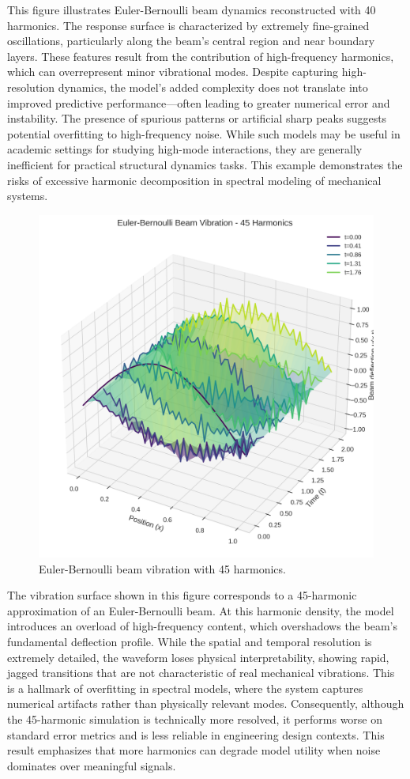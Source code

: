 \documentclass[preprint,12pt]{elsarticle}
\begin{document}
This figure illustrates Euler-Bernoulli beam dynamics reconstructed with 40 harmonics. The response surface is characterized by extremely fine-grained oscillations, particularly along the beam’s central region and near boundary layers. These features result from the contribution of high-frequency harmonics, which can overrepresent minor vibrational modes. Despite capturing high-resolution dynamics, the model's added complexity does not translate into improved predictive performance—often leading to greater numerical error and instability. The presence of spurious patterns or artificial sharp peaks suggests potential overfitting to high-frequency noise. While such models may be useful in academic settings for studying high-mode interactions, they are generally inefficient for practical structural dynamics tasks. This example demonstrates the risks of excessive harmonic decomposition in spectral modeling of mechanical systems.

\begin{figure}[t]
    \centering
    \includegraphics[width=0.9\linewidth]{figures/euler_bernoulli_3d_45h.png}
    \caption{Euler-Bernoulli beam vibration with 45 harmonics.}
    \label{fig:euler_45h}
\end{figure}

The vibration surface shown in this figure corresponds to a 45-harmonic approximation of an Euler-Bernoulli beam. At this harmonic density, the model introduces an overload of high-frequency content, which overshadows the beam’s fundamental deflection profile. While the spatial and temporal resolution is extremely detailed, the waveform loses physical interpretability, showing rapid, jagged transitions that are not characteristic of real mechanical vibrations. This is a hallmark of overfitting in spectral models, where the system captures numerical artifacts rather than physically relevant modes. Consequently, although the 45-harmonic simulation is technically more resolved, it performs worse on standard error metrics and is less reliable in engineering design contexts. This result emphasizes that more harmonics can degrade model utility when noise dominates over meaningful signals.
\end{document}
